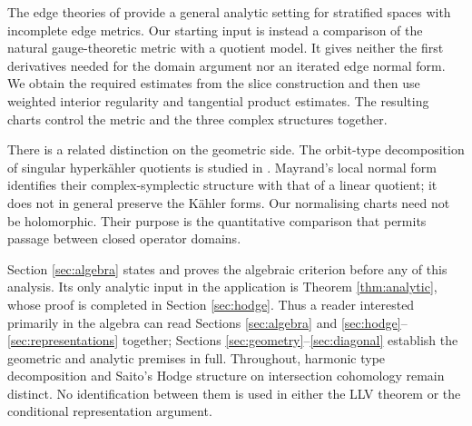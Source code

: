 The edge theories of \cite{hm05,almp12,almp18} provide a general
analytic setting for stratified spaces with incomplete edge
metrics. Our starting input is instead a comparison of the
natural gauge-theoretic metric with a quotient model. It gives
neither the first derivatives needed for the domain argument nor
an iterated edge normal form. We obtain the required estimates
from the slice construction and then use weighted interior
regularity and tangential product estimates. The resulting charts
control the metric and the three complex structures together.

There is a related distinction on the geometric side. The
orbit-type decomposition of singular hyperk\"ahler quotients is
studied in \cite{ds97,mayrand22}. Mayrand's local normal form
identifies their complex-symplectic structure with that of a
linear quotient; it does not in general preserve the K\"ahler
forms. Our normalising charts need not be holomorphic. Their
purpose is the quantitative comparison that permits passage
between closed operator domains.

Section \ref{sec:algebra} states and proves the algebraic
criterion before any of this analysis. Its only analytic input in
the application is Theorem \ref{thm:analytic}, whose proof is
completed in Section \ref{sec:hodge}. Thus a reader interested
primarily in the algebra can read Sections \ref{sec:algebra}
and \ref{sec:hodge}--\ref{sec:representations} together;
Sections \ref{sec:geometry}--\ref{sec:diagonal} establish the
geometric and analytic premises in full. Throughout, harmonic
type decomposition and Saito's Hodge structure on intersection
cohomology remain distinct. No identification between them is
used in either the LLV theorem or the conditional representation
argument.
